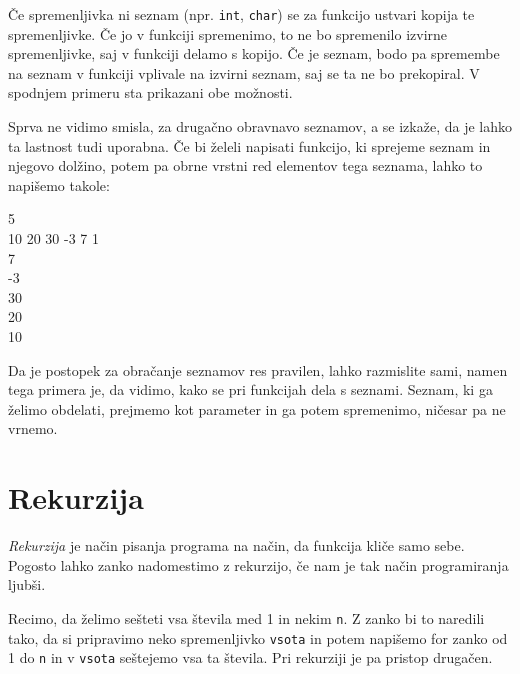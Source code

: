 \documentclass{book}
\begin{document}
Če spremenljivka ni seznam (npr. \verb+int+, \verb+char+) se za funkcijo
ustvari kopija te spremenljivke. Če jo v funkciji spremenimo, to ne bo
spremenilo izvirne spremenljivke, saj v funkciji delamo s kopijo. Če je seznam,
bodo pa spremembe na seznam v funkciji vplivale na izvirni seznam, saj se ta ne
bo prekopiral. V spodnjem primeru sta prikazani obe možnosti.

\begin{examples}
\end{examples}

\newpage

Sprva ne vidimo smisla, za drugačno obravnavo seznamov, a se izkaže, da je
lahko ta lastnost tudi uporabna. Če bi želeli napisati funkcijo, ki sprejeme
seznam in njegovo dolžino, potem pa obrne vrstni red elementov tega seznama,
lahko to napišemo takole:

\begin{examples}


    \begin{inout}
        5 \\
        10 20 30 -3 7 1
         \\ 7 \\ -3 \\ 30 \\ 20 \\ 10 \\
    \end{inout}

\end{examples}

Da je postopek za obračanje seznamov res pravilen, lahko razmislite sami, namen
tega primera je, da vidimo, kako se pri funkcijah dela s seznami. Seznam, ki ga
želimo obdelati, prejmemo kot parameter in ga potem spremenimo, ničesar pa ne
vrnemo.


\section{Rekurzija}

\emph{Rekurzija} je način pisanja programa na način, da funkcija kliče samo
sebe. Pogosto lahko zanko nadomestimo z rekurzijo, če nam je tak način
programiranja ljubši.

Recimo, da želimo sešteti vsa števila med 1 in nekim \verb+n+. Z zanko bi to
naredili tako, da si pripravimo neko spremenljivko \verb+vsota+ in potem
napišemo for zanko od 1 do \verb+n+ in v \verb+vsota+ seštejemo vsa ta števila. Pri
rekurziji je pa pristop drugačen.
\end{document}
